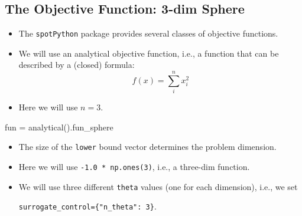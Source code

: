 \documentclass[
  letterpaper,
  DIV=11,
  numbers=noendperiod]{scrreprt}
\newenvironment{Shaded}{\begin{snugshade}}{\end{snugshade}}
\newcommand{\NormalTok}[1]{\textcolor[rgb]{0.00,0.23,0.31}{#1}}
\newcommand{\OperatorTok}[1]{\textcolor[rgb]{0.37,0.37,0.37}{#1}}
\begin{document}
\hypertarget{the-objective-function-3-dim-sphere}{%
\subsection{The Objective Function: 3-dim
Sphere}\label{the-objective-function-3-dim-sphere}}

\begin{itemize}
\item
  The \texttt{spotPython} package provides several classes of objective
  functions.
\item
  We will use an analytical objective function, i.e., a function that
  can be described by a (closed) formula: \[f(x) = \sum_i^n x_i^2 \]
\item
  Here we will use \(n=3\).
\end{itemize}

\begin{Shaded}
\begin{Highlighting}[]
\NormalTok{fun }\OperatorTok{=}\NormalTok{ analytical().fun\_sphere}
\end{Highlighting}
\end{Shaded}

\begin{itemize}
\item
  The size of the \texttt{lower} bound vector determines the problem
  dimension.
\item
  Here we will use \texttt{-1.0\ *\ np.ones(3)}, i.e., a three-dim
  function.
\item
  We will use three different \texttt{theta} values (one for each
  dimension), i.e., we set

  \texttt{surrogate\_control=\{"n\_theta":\ 3\}}.
\end{itemize}
\end{document}
